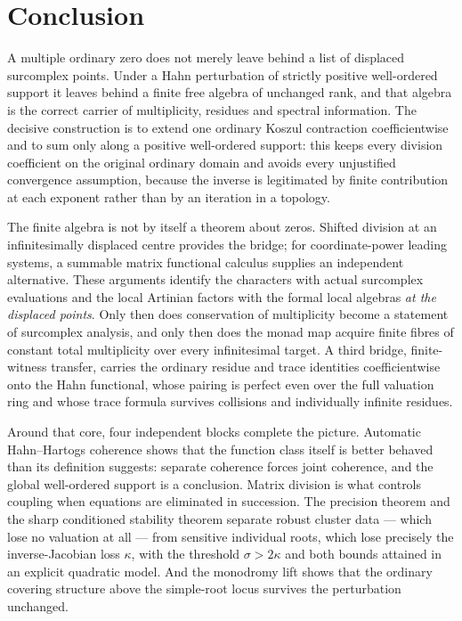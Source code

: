 \documentclass[11pt,letterpaper]{article}
\theoremstyle{definition}
\theoremstyle{remark}
\numberwithin{equation}{section}
\begin{document}
\section{Conclusion}
\label{finite:sec:conclusion}

A multiple ordinary zero does not merely leave behind a list of displaced surcomplex points. Under a Hahn perturbation of strictly positive well-ordered support it leaves behind a finite free algebra of unchanged rank, and that algebra is the correct carrier of multiplicity, residues and spectral information. The decisive construction is to extend one ordinary Koszul contraction coefficientwise and to sum only along a positive well-ordered support: this keeps every division coefficient on the original ordinary domain and avoids every unjustified convergence assumption, because the inverse is legitimated by finite contribution at each exponent rather than by an iteration in a topology.

The finite algebra is not by itself a theorem about zeros. Shifted division at an infinitesimally displaced centre provides the bridge; for coordinate-power leading systems, a summable matrix functional calculus supplies an independent alternative. These arguments identify the characters with actual surcomplex evaluations and the local Artinian factors with the formal local algebras \emph{at the displaced points}. Only then does conservation of multiplicity become a statement of surcomplex analysis, and only then does the monad map acquire finite fibres of constant total multiplicity over every infinitesimal target. A third bridge, finite-witness transfer, carries the ordinary residue and trace identities coefficientwise onto the Hahn functional, whose pairing is perfect even over the full valuation ring and whose trace formula survives collisions and individually infinite residues.

Around that core, four independent blocks complete the picture. Automatic Hahn--Hartogs coherence shows that the function class itself is better behaved than its definition suggests: separate coherence forces joint coherence, and the global well-ordered support is a conclusion. Matrix division is what controls coupling when equations are eliminated in succession. The precision theorem and the sharp conditioned stability theorem separate robust cluster data --- which lose no valuation at all --- from sensitive individual roots, which lose precisely the inverse-Jacobian loss $\kappa$, with the threshold $\sigma>2\kappa$ and both bounds attained in an explicit quadratic model. And the monodromy lift shows that the ordinary covering structure above the simple-root locus survives the perturbation unchanged.
\end{document}
